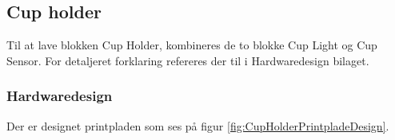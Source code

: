 \documentclass[Rapport/Rapport_main.tex]{subfiles}
\begin{document}
\subsection{Cup holder}
Til at lave blokken Cup Holder, kombineres de to blokke Cup Light og Cup Sensor. For detaljeret forklaring refereres der til  i Hardwaredesign bilaget.
\subsubsection{Hardwaredesign}
Der er designet printpladen som ses på figur \ref{fig:CupHolderPrintpladeDesign}. 

\begin{figure}[H]
\centering
{}
\end{figure}
\end{document}
